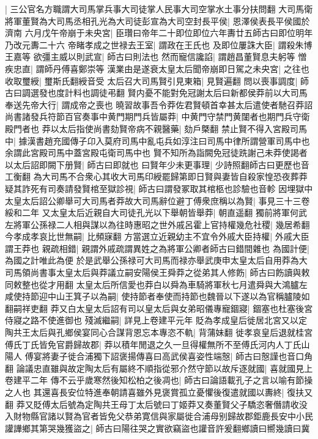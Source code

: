 |{
	三公官名方職謂大司馬掌兵事大司徒掌人民事大司空掌水土事分扶問翻}
大司馬衛將軍董賢為大司馬丞相孔光為大司徒彭宣為大司空封長平侯|{
	恩澤侯表長平侯國於濟南}
六月戊午帝崩于未央宮|{
	臣瓚曰帝年二十即位即位六年夀廿五師古曰即位明年乃改元夀二十六}
帝睹孝成之世禄去王室|{
	謂政在王氏也}
及即位屢誅大臣|{
	謂殺朱博王嘉等}
欲彊主威以則武宣|{
	師古曰則法也}
然而寵信讒諂|{
	謂趙昌董賢息夫躬等}
憎疾忠直|{
	謂師丹傅喜鄭崇等}
漢業由是遂衰太皇太后聞帝崩即日駕之未央宮|{
	之往也}
收取璽綬|{
	璽斯氏翻綬音受}
太后召大司馬賢引見東箱|{
	見賢遍翻}
問以喪事調度|{
	師古曰調選發也度計料也調徒弔翻}
賢内憂不能對免冠謝太后曰新都侯莽前以大司馬奉送先帝大行|{
	謂成帝之喪也}
曉習故事吾令莽佐君賢頓首幸甚太后遣使者馳召莽詔尚書諸發兵符節百官奏事中黄門期門兵皆屬莽|{
	中黄門守禁門黄闥者也期門兵守衛殿門者也}
莽以太后指使尚書劾賢帝病不親醫藥|{
	劾戶槩翻}
禁止賢不得入宮殿司馬中|{
	據漢書趙充國傳子卬入莫府司馬中亂屯兵如淳注曰司馬中律所謂營軍司馬中也余謂此宮殿司馬中蓋宮殿屯衛司馬中也}
賢不知所為詣闕免冠徒跣謝己未莽使謁者以太后詔即闕下册賢|{
	師古曰即就也}
曰賢年少未更事理|{
	少詩照翻師古曰更歷也音工衡翻}
為大司馬不合衆心其收大司馬印綬罷歸第即日賢與妻皆自殺家惶恐夜葬莽疑其詐死有司奏請發賢棺至獄診視|{
	師古曰謂發冢取其棺柩也診驗也音軫}
因埋獄中太皇太后詔公卿舉可大司馬者莽故大司馬辭位避丁傅衆庶稱以為賢|{
	事見三十三卷綏和二年}
又太皇太后近親自大司徒孔光以下舉朝皆舉莽|{
	朝直遥翻}
獨前將軍何武左將軍公孫禄二人相與謀以為往時惠昭之世外戚呂霍上官持權幾危社稷|{
	幾居希翻}
今孝成孝哀比世無嗣|{
	比頻寐翻}
方當選立近親幼主不宜令外戚大臣持權|{
	外戚大臣謂王莽也}
親疏相錯|{
	親謂外戚疏謂異姓之為將軍公卿者師古曰錯間雜也}
為國計便|{
	為國之計唯此為便}
於是武舉公孫禄可大司馬而禄亦舉武庚申太皇太后自用莽為大司馬領尚書事太皇太后與莽議立嗣安陽侯王舜莽之從弟其人修飭|{
	師古曰飭讀與敕同敕整也從才用翻}
太皇太后所信愛也莽白以舜為車騎將軍秋七月遣舜與大鴻臚左咸使持節迎中山王箕子以為嗣|{
	使持節者奉使而持節也魏晉以下遂以為官稱臚陵如翻嗣祥吏翻}
莽又白太皇太后詔有司以皇太后與女弟昭儀專寵錮寢|{
	錮塞也杜塞後宮侍寢之路不使進御也}
殘滅繼嗣|{
	詳見上卷建平元年}
貶為孝成皇后徙居北宮又以定陶共王太后與孔鄉侯宴同心合謀背恩忘本專恣不軌|{
	背蒲妹翻}
徙孝哀皇后退就桂宮傅氏丁氏皆免官爵歸故郡|{
	莽以積年閒退之久一旦得權無所不至傅氏河内人丁氏山陽人}
傅宴將妻子徙合浦獨下詔褒揚傳喜曰高武侯喜姿性端慤|{
	師古曰慤謹也音口角翻}
論議忠直雖與故定陶太后有屬終不順指從邪介然守節以故斥逐就國|{
	喜就國見上卷建平二年}
傳不云乎歲寒然後知松柏之後凋也|{
	師古曰論語載孔子之言以喻有節操之人也}
其還喜長安位特進奉朝請喜雖外見褒賞孤立憂懼後復遣就國以夀終|{
	復扶又翻}
莽又貶傅太后號為定陶共王母丁太后號曰丁姬莽又奏董賢父子驕恣奢僭請收没入財物縣官諸以賢為官者皆免父恭弟寛信與家屬徙合浦母别歸故郡鉅鹿長安中小民讙譁鄉其第哭幾獲盜之|{
	師古曰陽往哭之實欲竊盜也讙音許爰翻鄉讀曰嚮幾讀曰冀}
